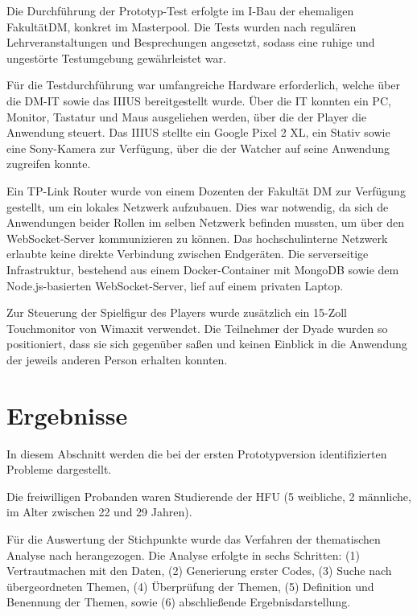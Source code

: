 Die Durchführung der Prototyp-Test erfolgte im I-Bau der ehemaligen Fakultät\ac{DM}, konkret im Masterpool. Die Tests wurden nach regulären Lehrveranstaltungen und Besprechungen angesetzt, sodass eine ruhige und ungestörte Testumgebung gewährleistet war.

Für die Testdurchführung war umfangreiche Hardware erforderlich, welche über die \ac{DM}-IT sowie das \ac{IIIUS} bereitgestellt wurde. Über die IT konnten ein PC, Monitor, Tastatur und Maus ausgeliehen werden, über die der Player die Anwendung steuert. Das \ac{IIIUS} stellte ein Google Pixel 2 XL, ein Stativ sowie eine Sony-Kamera zur Verfügung, über die der Watcher auf seine Anwendung zugreifen konnte.

Ein TP-Link Router wurde von einem Dozenten der Fakultät \ac{DM} zur Verfügung gestellt, um ein lokales Netzwerk aufzubauen. Dies war notwendig, da sich de Anwendungen beider Rollen im selben Netzwerk befinden mussten, um über den WebSocket-Server kommunizieren zu können. Das hochschulinterne Netzwerk erlaubte keine direkte Verbindung zwischen Endgeräten. Die serverseitige Infrastruktur, bestehend aus einem Docker-Container mit MongoDB sowie dem Node.js-basierten WebSocket-Server, lief auf einem privaten Laptop.

Zur Steuerung der Spielfigur des Players wurde zusätzlich ein 15-Zoll Touchmonitor von Wimaxit verwendet. Die Teilnehmer der Dyade wurden so positioniert, dass sie sich gegenüber saßen und keinen Einblick in die Anwendung der jeweils anderen Person erhalten konnten.

\section{Ergebnisse}\label{sec:pre-study-method-results}

In diesem Abschnitt werden die bei der ersten Prototypversion identifizierten Probleme dargestellt.

Die freiwilligen Probanden waren Studierende der \ac{HFU} (5 weibliche, 2 männliche, im Alter zwischen 22 und 29 Jahren).

Für die Auswertung der Stichpunkte wurde das Verfahren der thematischen Analyse nach \cite{braun_using_2006} herangezogen. Die Analyse erfolgte in sechs Schritten: (1) Vertrautmachen mit den Daten, (2) Generierung erster Codes, (3) Suche nach übergeordneten Themen, (4) Überprüfung der Themen, (5) Definition und Benennung der Themen, sowie (6) abschließende Ergebnisdarstellung.

